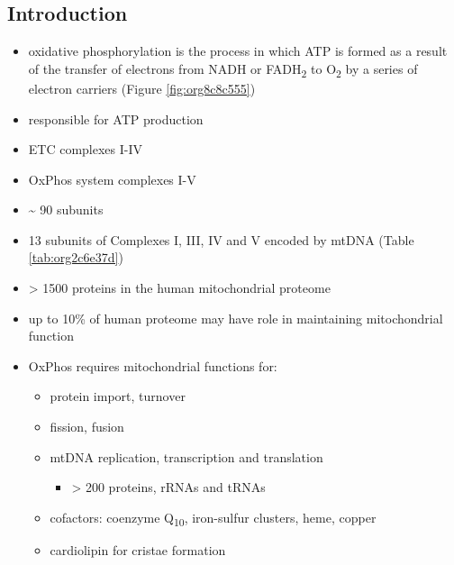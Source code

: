 \documentclass{scrartcl}
\begin{document}
\subsection{Introduction}
\label{sec:org68083fc}
\begin{itemize}
\item oxidative phosphorylation is the process in which ATP is formed as a
result of the transfer of electrons from NADH or FADH\textsubscript{2} to O\textsubscript{2} by a
series of electron carriers (Figure \ref{fig:org8c8c555})
\item responsible for ATP production
\item ETC complexes I-IV
\item OxPhos system complexes I-V
\item \textasciitilde{} 90 subunits
\item 13 subunits of Complexes I, III, IV and V encoded by mtDNA (Table \ref{tab:org2c6e37d})
\item \textgreater{} 1500 proteins in the human mitochondrial proteome
\item up to 10\% of human proteome may have role in maintaining mitochondrial function
\item OxPhos requires mitochondrial functions for:
\begin{itemize}
\item protein import, turnover
\item fission, fusion
\item mtDNA replication, transcription and translation
\begin{itemize}
\item \textgreater{} 200 proteins, rRNAs and tRNAs
\end{itemize}
\item cofactors: coenzyme Q\textsubscript{10}, iron-sulfur clusters, heme, copper
\item cardiolipin for cristae formation
\end{itemize}


\end{itemize}
\end{document}
